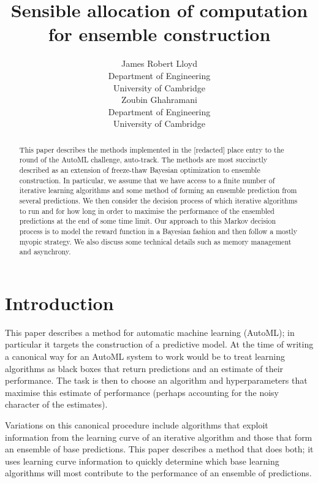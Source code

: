 \documentclass{article} %
\title{Sensible allocation of computation\\for ensemble construction}
\author{
James Robert Lloyd\\
Department of Engineering\\
University of Cambridge\\
\And
Zoubin Ghahramani\\
Department of Engineering\\
University of Cambridge\\
}
\begin{document}
\def\ParamSpace{\Theta}
\def\Param{\theta}
\def\Observation{y}
\def\ObservationVector{Y}
\def\ObservationSpace{\mathcal{Y}}
\def\Func{f}
\def\FuncTime{g}
\def\Noise{\varepsilon}
\def\Input{x}
\def\InputVector{X}
\def\InputSpace{\mathcal{X}}

\maketitle


\begin{abstract} 
This paper describes the methods implemented in the [redacted] place entry to the  round of the AutoML challenge, auto-track.
The methods are most succinctly described as an extension of freeze-thaw Bayesian optimization to ensemble construction.
In particular, we assume that we have access to a finite number of iterative learning algorithms and some method of forming an ensemble prediction from several predictions.
We then consider the decision process of which iterative algorithms to run and for how long in order to maximise the performance of the ensembled predictions at the end of some time limit.
Our approach to this Markov decision process is to model the reward function in a Bayesian fashion and then follow a mostly myopic strategy.
We also discuss some technical details such as memory management and asynchrony.
\end{abstract} 

\allowdisplaybreaks


\section{Introduction}

This paper describes a method for automatic machine learning (AutoML); in particular it targets the construction of a predictive model.
At the time of writing a canonical way for an AutoML system to work would be to treat learning algorithms as black boxes that return predictions and an estimate of their performance.
The task is then to choose an algorithm and hyperparameters that maximise this estimate of performance (perhaps accounting for the noisy character of the estimates).

Variations on this canonical procedure include algorithms that exploit information from the learning curve of an iterative algorithm and those that form an ensemble\footnotemark{} of base predictions.
This paper describes a method that does both; it uses learning curve information to quickly determine which base learning algorithms will most contribute to the performance of an ensemble of predictions.
\end{document}
